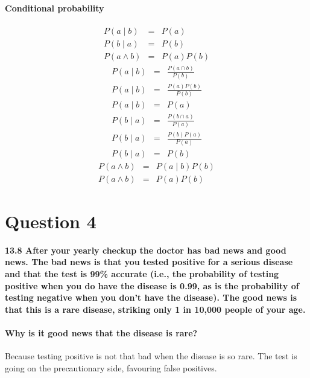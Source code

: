 \documentclass[a4paper, 12 pt, conference, onecolumn]{IEEEconf}
\begin{document}
\paragraph{Conditional probability}
\begin{eqnarray}
P(a \mid b) &=& P(a) \\
P(b \mid a) &=& P(b) \\
P(a \wedge b) &=& P(a)P(b)
\end{eqnarray}
\begin{eqnarray}
P(a \mid b) &=& \frac{P(a \cap b)}{P(b)} \\
P(a \mid b) &=& \frac{P(a)P(b)}{P(b)} \\
P(a \mid b) &=& P(a)
\end{eqnarray}
\begin{eqnarray}
P(b \mid a) &=& \frac{P(b \cap a)}{P(a)} \\
P(b \mid a) &=& \frac{P(b)P(a)}{P(a)} \\
P(b \mid a) &=& P(b)
\end{eqnarray}
\begin{eqnarray}
P(a \wedge b) &=& P(a \mid b)P(b) \\
P(a \wedge b) &=& P(a)P(b)
\end{eqnarray}



\section{Question 4}
\setcounter{paragraph}{0}
\textbf{13.8 After your yearly checkup the doctor has bad news and good news. The bad news is that you tested positive for a serious disease and that the test is 99\% accurate (i.e., the probability of testing positive when you do have the disease is 0.99, as is the probability of testing negative when you don't have the disease). The good news is that this is a rare disease, striking only 1 in 10,000 people of your age.}
\paragraph{Why is it good news that the disease is rare?}
Because testing positive is not that bad when the disease is so rare. The test is going on the precautionary side, favouring false positives. 
\end{document}
